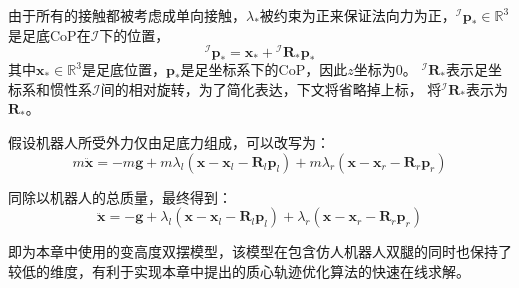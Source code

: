 由于所有的接触都被考虑成单向接触，$\lambda_*$被约束为正来保证法向力为正，${ }^{\mathcal{I}} \boldsymbol{p}_* \in \mathbb{R}^{3}$
是足底CoP在$\mathcal{I}$下的位置，
\begin{equation}
    \label{equ:cop}
    { }^{\mathcal{I}} \boldsymbol{p}_*=\boldsymbol{x}_*+{ }^{\mathcal{I}} \boldsymbol{R}_* \boldsymbol{p}_*
\end{equation}
其中$\boldsymbol{x}_* \in \mathbb{R}^{3}$是足底位置，$\boldsymbol{p}_*$是足坐标系下的CoP，因此$z$坐标为0。
${ }^{\mathcal{I}} \boldsymbol{R}_*$表示足坐标系和惯性系$\mathcal{I}$间的相对旋转，为了简化表达，下文将省略掉上标，
将${ }^{\mathcal{I}} \boldsymbol{R}_*$表示为$\boldsymbol{R}_*$。

假设机器人所受外力仅由足底力组成，可以改写为：
\begin{equation}
    \label{equ:newton_linear_1}
    m \ddot{\boldsymbol{x}}= -m \boldsymbol{g}+m \lambda_l\left(\boldsymbol{x}-\boldsymbol{x}_l-\boldsymbol{R}_l \boldsymbol{p}_l\right)
    +m \lambda_r\left(\boldsymbol{x}-\boldsymbol{x}_r-\boldsymbol{R}_r \boldsymbol{p}_r\right)
\end{equation}

同除以机器人的总质量，最终得到：
\begin{equation}
    \label{equ:newton_linear_2}
    \ddot{\boldsymbol{x}}= -\boldsymbol{g}+\lambda_l\left(\boldsymbol{x}-\boldsymbol{x}_l-\boldsymbol{R}_l \boldsymbol{p}_l\right) 
        +\lambda_r\left(\boldsymbol{x}-\boldsymbol{x}_r-\boldsymbol{R}_r \boldsymbol{p}_r\right)
\end{equation}

即为本章中使用的变高度双摆模型，该模型在包含仿人机器人双腿的同时也保持了较低的维度，有利于实现本章中提出的质心轨迹优化算法的快速在线求解。
